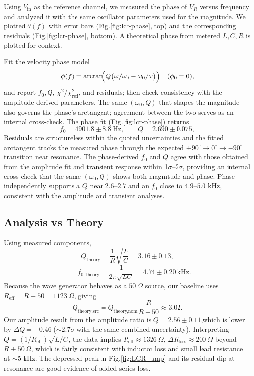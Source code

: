 \documentclass[
	a4paper, %
	10pt, %
	twoside, %
]{journal}
\begin{document}
Using $V_{\text{in}}$ as the reference channel, we measured the phase of $V_R$ versus frequency and analyzed it with the same oscillator parameters used for the magnitude.
We plotted $\theta(f)$ with error bars (Fig.\ref{fig:lcr-phase}, top) and the corresponding residuals (Fig.\ref{fig:lcr-phase}, bottom). A theoretical phase from metered $L,C,R$ is plotted for context.

Fit the velocity phase model
\[
\phi(f)=\arctan\!\Bigl(Q\bigl(\omega/\omega_0-\omega_0/\omega\bigr)\Bigr)\quad(\phi_0=0),
\]
and report $f_0,Q$, $\chi^2$/$\chi^2_\text{red}$, and residuals; then check consistency with the amplitude-derived parameters.
The same $(\omega_0,Q)$ that shapes the magnitude also governs the phase’s arctangent; agreement between the two serves as an internal cross-check.
The phase fit (Fig.\ref{fig:lcr-phase}) returns
\[
f_{0}=4901.8\pm 8.8~\text{Hz},\qquad
Q=2.690\pm0.075,
\]
Residuals are structureless within the quoted uncertainties and the fitted arctangent tracks the measured phase through the expected $+90^\circ\!\rightarrow 0^\circ\!\rightarrow -90^\circ$ transition near resonance.
The phase-derived $f_{0}$ and $Q$ agree with those obtained from the amplitude fit and transient response within 1$\sigma$–2$\sigma$, providing an internal cross-check that the same $(\omega_{0},Q)$ shows   both magnitude and phase.
Phase independently supports a $Q$ near $2.6$–$2.7$ and an $f_0$ close to $4.9$–$5.0$ kHz, consistent with the amplitude and transient analyses.

\subsection{Analysis vs Theory}
Using measured components,
\[
Q_{\text{theory}}=\frac{1}{R}\sqrt{\frac{L}{C}}=3.16\pm0.13,\]
\[\qquad
f_{0,\text{theory}}=\frac{1}{2\pi\sqrt{LC}}=4.74\pm0.20\ \text{kHz}.
\]
Because the wave generator behaves as a $50~\Omega$ source, our baseline uses $R_{\text{eff}}=R+50=1123~\Omega$, giving
\[
Q_{\text{theory,src}}=Q_{\text{theory,nom}}\frac{R}{R+50}\approx 3.02.
\]
Our  amplitude result from the amplitude ratio is $Q=2.56\pm0.11$,which is lower by $\Delta Q=-0.46$ ($\sim2.7\sigma$ with the same combined uncertainty). Interpreting $Q=(1/R_\text{eff})\sqrt{L/C}$, the data implies $R_\text{eff}\approx1326~\Omega$, $\Delta R_{\text{loss}}\approx 200~\Omega$ beyond $R+50~\Omega$, which is fairly consistent with inductor loss and small lead resistance at $\sim5$ kHz. The depressed peak in Fig.\ref{fig:LCR_amp} and its residual dip at resonance are  good evidence of added series loss.
\end{document}
